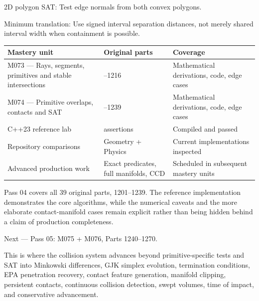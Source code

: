 2D polygon SAT: Test edge normals from both convex polygons.

Minimum translation: Use signed interval separation distances, not merely shared interval width when containment is possible.

{\def\LTcaptype{none} %
\begin{longtable}[]{@{}
  >{\raggedright\arraybackslash}p{}
  >{\raggedright\arraybackslash}p{}
  >{\raggedright\arraybackslash}p{}@{}}
\toprule\noalign{}
\begin{minipage}[b]{\linewidth}\raggedright
Mastery unit
\end{minipage} & \begin{minipage}[b]{\linewidth}\raggedright
Original parts
\end{minipage} & \begin{minipage}[b]{\linewidth}\raggedright
Coverage
\end{minipage} \\
\midrule\noalign{}
\endhead
\bottomrule\noalign{}
\endlastfoot
M073 --- Rays, segments, primitives and stable intersections & 1201--1216 & Mathematical derivations, code, edge cases \\
M074 --- Primitive overlaps, contacts and SAT & 1217--1239 & Mathematical derivations, code, edge cases \\
C++23 reference lab & 36 assertions & Compiled and passed \\
Repository comparisons & Geometry + Physics & Current implementations inspected \\
Advanced production work & Exact predicates, full manifolds, CCD & Scheduled in subsequent mastery units \\
\end{longtable}
}

Pass 04 covers all 39 original parts, 1201--1239. The reference implementation demonstrates the core algorithms, while the numerical caveats and the more elaborate contact-manifold cases remain explicit rather than being hidden behind a claim of production completeness.

Next --- Pass 05: M075 + M076, Parts 1240--1270.

This is where the collision system advances beyond primitive-specific tests and SAT into Minkowski differences, GJK simplex evolution, termination conditions, EPA penetration recovery, contact feature generation, manifold clipping, persistent contacts, continuous collision detection, swept volumes, time of impact, and conservative advancement.

